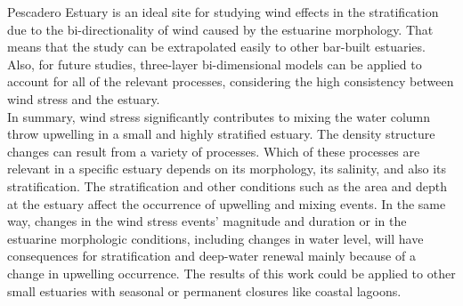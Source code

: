 \documentclass[tesis.tex]{subfiles}
\begin{document}
Pescadero Estuary is an ideal site for studying wind effects in the stratification due to the bi-directionality of wind caused by the estuarine morphology. That means that the study can be extrapolated easily to other bar-built estuaries. Also, for future studies, three-layer bi-dimensional models can be applied to account for all of the relevant processes, considering the high consistency between wind stress and the estuary.\\

In summary, wind stress significantly contributes to mixing the water column throw upwelling in a small and highly stratified estuary. The density structure changes can result from a variety of processes. Which of these processes are relevant in a specific estuary depends on its morphology, its salinity, and also its stratification. The stratification and other conditions such as the area and depth at the estuary affect the occurrence of upwelling and mixing events. In the same way, changes in the wind stress events' magnitude and duration or in the estuarine morphologic conditions, including changes in water level, will have consequences for stratification and deep-water renewal mainly because of a change in upwelling occurrence. The results of this work could be applied to other small estuaries with seasonal or permanent closures like coastal lagoons.\\
\end{document}
